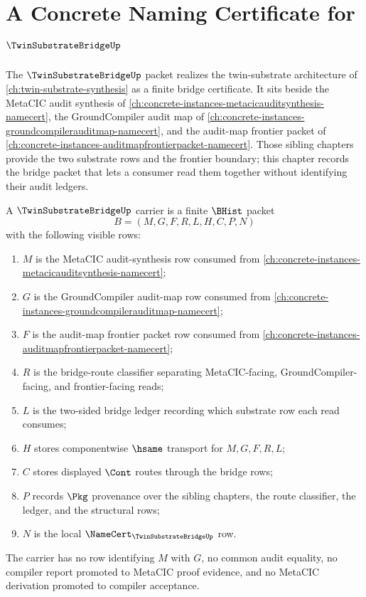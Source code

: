 \chapter{A Concrete Naming Certificate for $\TwinSubstrateBridgeUp$}
\label{ch:concrete-instances-twinsubstratebridge-namecert}

The $\TwinSubstrateBridgeUp$ packet realizes the twin-substrate architecture of \autoref{ch:twin-substrate-synthesis} as a finite bridge certificate. It sits beside the MetaCIC audit synthesis of \autoref{ch:concrete-instances-metacicauditsynthesis-namecert}, the GroundCompiler audit map of \autoref{ch:concrete-instances-groundcompilerauditmap-namecert}, and the audit-map frontier packet of \autoref{ch:concrete-instances-auditmapfrontierpacket-namecert}. Those sibling chapters provide the two substrate rows and the frontier boundary; this chapter records the bridge packet that lets a consumer read them together without identifying their audit ledgers.

\begin{definition}
\label{def:twin-substrate-bridge-carrier}
A $\TwinSubstrateBridgeUp$ carrier is a finite $\BHist$ packet
$$
B=(M,G,F,R,L,H,C,P,N)
$$
with the following visible rows:
\begin{enumerate}
\item $M$ is the MetaCIC audit-synthesis row consumed from \autoref{ch:concrete-instances-metacicauditsynthesis-namecert};
\item $G$ is the GroundCompiler audit-map row consumed from \autoref{ch:concrete-instances-groundcompilerauditmap-namecert};
\item $F$ is the audit-map frontier packet row consumed from \autoref{ch:concrete-instances-auditmapfrontierpacket-namecert};
\item $R$ is the bridge-route classifier separating MetaCIC-facing, GroundCompiler-facing, and frontier-facing reads;
\item $L$ is the two-sided bridge ledger recording which substrate row each read consumes;
\item $H$ stores componentwise $\hsame$ transport for $M,G,F,R,L$;
\item $C$ stores displayed $\Cont$ routes through the bridge rows;
\item $P$ records $\Pkg$ provenance over the sibling chapters, the route classifier, the ledger, and the structural rows;
\item $N$ is the local $\NameCert_{\TwinSubstrateBridgeUp}$ row.
\end{enumerate}
The carrier has no row identifying $M$ with $G$, no common audit equality, no compiler report promoted to MetaCIC proof evidence, and no MetaCIC derivation promoted to compiler acceptance.
\end{definition}

